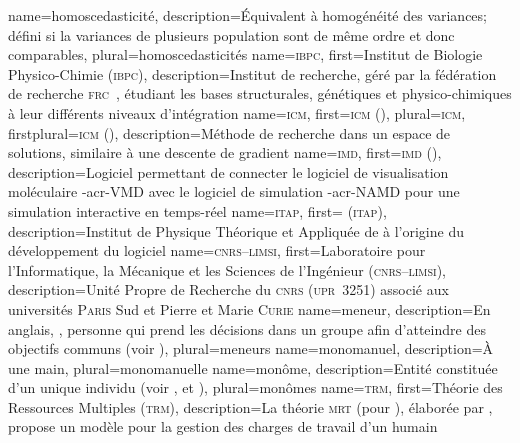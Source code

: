 {%
	name={homoscedasticité},%
	description={Équivalent à homogénéité des variances; défini si la variances de plusieurs population sont de même ordre et donc comparables},
	plural={homoscedasticités}%
}
%
{%
	name={\textsc{ibpc}},%
	first={Institut de Biologie Physico-Chimie (\textsc{ibpc})},%
	description={Institut de recherche, géré par la fédération de recherche \textsc{frc}~, étudiant les bases structurales, génétiques et physico-chimiques à leur différents niveaux d'intégration}%
}
%
{%
	name={\textsc{icm}},
	first={\textsc{icm} ()},%
	plural={\textsc{icm}},
	firstplural={\textsc{icm} ()},%
	description={Méthode de recherche dans un espace de solutions, similaire à une descente de gradient}
}
%
{%
	name={\textsc{imd}},%
	first={\textsc{imd} ()},%
	description={Logiciel permettant de connecter le logiciel de visualisation moléculaire \myacro-{acr-VMD} avec le logiciel de simulation \myacro-{acr-NAMD} pour une simulation interactive en temps-réel }%
}
%
{%
	name={\textsc{itap}},%
	first={ (\textsc{itap})},%
	description={Institut de Physique Théorique et Appliquée de  à l'origine du développement du logiciel }%
}
%
{%
	name={\textsc{cnrs--limsi}},%
	first={Laboratoire pour l'Informatique, la Mécanique et les Sciences de l'Ingénieur (\textsc{cnrs--limsi})},%
	description={Unité Propre de Recherche du \textsc{cnrs} (\textsc{upr}~3251) associé aux universités \textsc{Paris} Sud et Pierre et Marie \textsc{Curie}}%
}
%
{%
	name={meneur},%
	description={En anglais, , personne qui prend les décisions dans un groupe afin d'atteindre des objectifs communs (voir )},%
	plural={meneurs}%
}
%
{%
	name={monomanuel},%
	description={À une main},%
	plural={monomanuelle}%
}
%
{%
	name={monôme},%
	description={Entité constituée d'un unique individu (voir ,  et )},%
	plural={monômes}%
}
%
{%
	name={\textsc{trm}},
	first={Théorie des Ressources Multiples (\textsc{trm})},%
	description={La théorie \textsc{mrt} (pour ), élaborée par , propose un modèle pour la gestion des charges de travail d'un humain}
}
